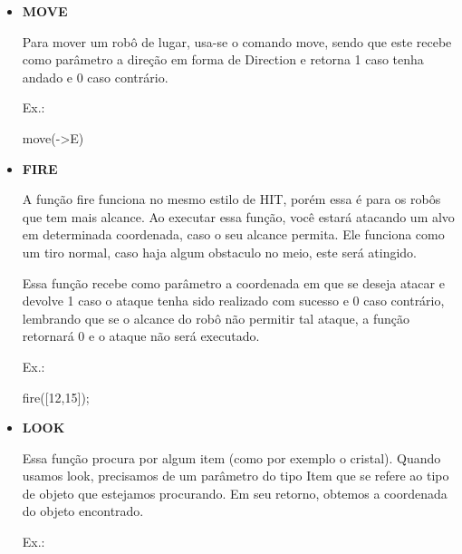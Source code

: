 \documentclass[a4paper]{article}
\begin{document}
{{{{\begin{itemize}
            \textcolor{NavyBlue}{Ex.:}
            
            hit(->NW)

        \bigskip
        
        \item \textbf{MOVE}
            
            Para mover um robô de lugar, usa-se o comando
            \textcolor{NavyBlue}{move},
            sendo que este recebe como parâmetro a direção
            em forma de Direction e retorna 1 caso
            tenha andado e 0 caso contrário.
                
            \textcolor{NavyBlue}{Ex.:}

            move(->E)
            
        \bigskip

        \item \textbf{FIRE}
            
            A função 
            \textcolor{NavyBlue}{fire}
            funciona no mesmo estilo de HIT,
            porém essa é para os robôs que tem mais alcance.
            Ao executar essa função, você estará atacando um
            alvo em determinada coordenada, caso o seu alcance
            permita.
            Ele funciona como um tiro normal, caso haja algum
            obstaculo no meio, este será atingido.
            
            Essa função recebe como parâmetro a coordenada em
            que se deseja atacar e devolve 1 caso o ataque tenha
            sido realizado com sucesso e 0 caso contrário,
            lembrando que se o alcance do robô não permitir tal 
            ataque, a função retornará 0 e o ataque não será
            executado.
            
            \textcolor{NavyBlue}{Ex.:}
            
            fire([12,15]);

        \bigskip
        
        \item \textbf{LOOK}
        
            Essa função procura por algum item (como por exemplo
            o cristal).
            Quando usamos 
            \textcolor{NavyBlue}{look},
            precisamos de um parâmetro do tipo Item que se refere
            ao tipo de objeto que estejamos procurando.
            Em seu retorno, obtemos a coordenada do objeto encontrado.

            \textcolor{NavyBlue}{Ex.:}
            

\end{itemize}}}}}
\end{document}
